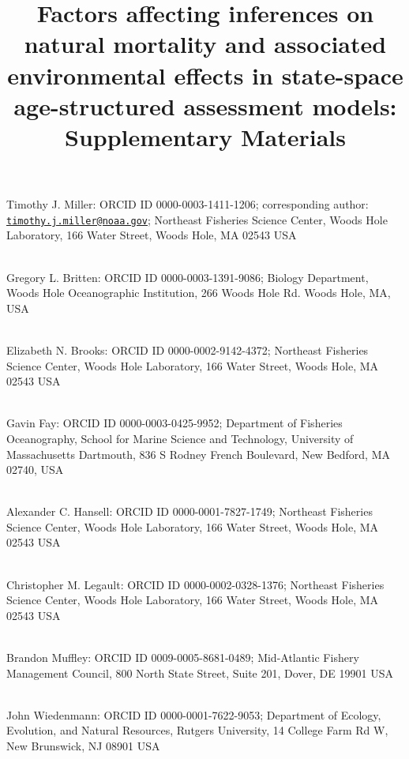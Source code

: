 \documentclass[
  12pt,
]{article}
\title{Factors affecting inferences on natural mortality and associated
environmental effects in state-space age-structured assessment models:\\
Supplementary Materials}
\author{}
\date{\vspace{-2.5em}}
\begin{document}
\maketitle

Timothy J. Miller: ORCID ID 0000-0003-1411-1206; corresponding author:
\href{mailto:timothy.j.miller@noaa.gov}{\nolinkurl{timothy.j.miller@noaa.gov}};
Northeast Fisheries Science Center, Woods Hole Laboratory, 166 Water
Street, Woods Hole, MA 02543 USA\\
\strut \\
Gregory L. Britten: ORCID ID 0000-0003-1391-9086; Biology Department,
Woods Hole Oceanographic Institution, 266 Woods Hole Rd. Woods Hole, MA,
USA\\
\strut \\
Elizabeth N. Brooks: ORCID ID 0000-0002-9142-4372; Northeast Fisheries
Science Center, Woods Hole Laboratory, 166 Water Street, Woods Hole, MA
02543 USA\\
\strut \\
Gavin Fay: ORCID ID 0000-0003-0425-9952; Department of Fisheries
Oceanography, School for Marine Science and Technology, University of
Massachusetts Dartmouth, 836 S Rodney French Boulevard, New Bedford, MA
02740, USA\\
\strut \\
Alexander C. Hansell: ORCID ID 0000-0001-7827-1749; Northeast Fisheries
Science Center, Woods Hole Laboratory, 166 Water Street, Woods Hole, MA
02543 USA\\
\strut \\
Christopher M. Legault: ORCID ID 0000-0002-0328-1376; Northeast
Fisheries Science Center, Woods Hole Laboratory, 166 Water Street, Woods
Hole, MA 02543 USA\\
\strut \\
Brandon Muffley: ORCID ID 0009-0005-8681-0489; Mid-Atlantic Fishery
Management Council, 800 North State Street, Suite 201, Dover, DE 19901
USA\\
\strut \\
John Wiedenmann: ORCID ID 0000-0001-7622-9053; Department of Ecology,
Evolution, and Natural Resources, Rutgers University, 14 College Farm Rd
W, New Brunswick, NJ 08901 USA\\

\pagebreak

\setcounter{figure}{0}
\renewcommand\thefigure{S\arabic{figure}}

\setcounter{table}{0}
\renewcommand\thetable{S\arabic{table}}

\pagebreak
\end{document}
